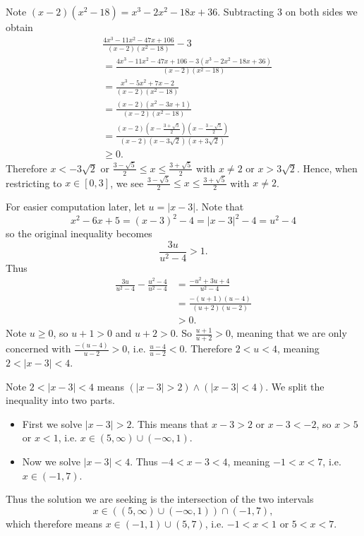 \begin{questions}
\begin{partquestions}{\roman*}
        \item Note $(x-2)(x^2-18) = x^3 - 2x^2 - 18x + 36$. Subtracting 3 on both sides we obtain
        \begin{align*}
            &\frac{4x^3 - 11x^2 - 47x + 106}{(x-2)(x^2-18)} - 3\\
            &= \frac{4x^3 - 11x^2 - 47x + 106 - 3(x^3 - 2x^2 - 18x + 36)}{(x-2)(x^2-18)}\\
            &= \frac{x^3 - 5x^2 + 7x - 2}{(x-2)(x^2-18)}\\
            &= \frac{(x-2)(x^2-3x+1)}{(x-2)(x^2-18)}\\
            &= \frac{(x-2)\left(x - \frac{3+\sqrt5}{2}\right)\left(x - \frac{3-\sqrt5}{2}\right)}{(x-2)(x-3\sqrt2)(x+3\sqrt2)}\\
            &\geq 0.
        \end{align*}
        Therefore $x < -3\sqrt2$ or $\frac{3-\sqrt5}{2} \leq x \leq \frac{3+\sqrt5}{2}$ with $x \neq 2$ or $x > 3\sqrt2$. Hence, when restricting to $x \in [0, 3]$, we see $\frac{3-\sqrt5}{2} \leq x \leq \frac{3+\sqrt5}{2}$ with $x \neq 2$.
    \end{partquestions}

    \item For easier computation later, let $u = |x-3|$. Note that
    \[
        x^2 - 6x + 5 = (x-3)^2 - 4 = |x-3|^2 - 4 = u^2 - 4
    \]
    so the original inequality becomes
    \[
        \frac{3u}{u^2 - 4} > 1.
    \]
    Thus
    \begin{align*}
        \frac{3u}{u^2-4} - \frac{u^2 - 4}{u^2 - 4} &= \frac{-u^2 + 3u + 4}{u^2-4}\\
        &= \frac{-(u+1)(u-4)}{(u+2)(u-2)}\\
        &> 0.
    \end{align*}
    Note $u \geq 0$, so $u+1 > 0$ and $u+2 > 0$. So $\frac{u+1}{u+2} > 0$, meaning that we are only concerned with $\frac{-(u-4)}{u-2} > 0$, i.e. $\frac{u-4}{u-2} < 0$. Therefore $2 < u < 4$, meaning $2 < |x - 3| < 4$.

    Note $2 < |x - 3| < 4$ means $(|x-3| > 2) \land (|x-3| < 4)$. We split the inequality into two parts.
    \begin{itemize}
        \item First we solve $|x-3| > 2$. This means that $x - 3 > 2$ or $x - 3 < -2$, so $x > 5$ or $x < 1$, i.e. $x \in (5, \infty) \cup (-\infty, 1)$.
        \item Now we solve $|x - 3| < 4$. Thus $-4 < x-3 < 4$, meaning $-1 < x < 7$, i.e. $x \in (-1, 7)$.
    \end{itemize}
    Thus the solution we are seeking is the intersection of the two intervals
    \[
        x \in ((5, \infty) \cup (-\infty, 1)) \cap (-1, 7),
    \]
    which therefore means $x \in (-1, 1) \cup (5, 7)$, i.e. $-1 < x < 1$ or $5 < x < 7$.


\end{questions}
